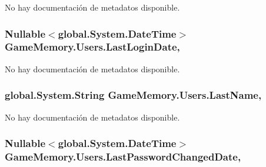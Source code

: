 No hay documentación de metadatos disponible. 

\hypertarget{class_game_memory_1_1_users_abb9ebf3a6108d29f1eea6eec2142b3d1}{
\subsubsection[{Last\-Login\-Date}]{\setlength{\rightskip}{0pt plus 5cm}Nullable$<$global.\-System.\-Date\-Time$>$ Game\-Memory.\-Users.\-Last\-Login\-Date\hspace{0.3cm}{\ttfamily [get]}, {\ttfamily [set]}}}\label{class_game_memory_1_1_users_abb9ebf3a6108d29f1eea6eec2142b3d1}


No hay documentación de metadatos disponible. 

\hypertarget{class_game_memory_1_1_users_a440ecd49516fc34c62e82845bcefbb69}{
\subsubsection[{Last\-Name}]{\setlength{\rightskip}{0pt plus 5cm}global.\-System.\-String Game\-Memory.\-Users.\-Last\-Name\hspace{0.3cm}{\ttfamily [get]}, {\ttfamily [set]}}}\label{class_game_memory_1_1_users_a440ecd49516fc34c62e82845bcefbb69}


No hay documentación de metadatos disponible. 

\hypertarget{class_game_memory_1_1_users_a98f39140ef43f86f9edcff50e40c982a}{
\subsubsection[{Last\-Password\-Changed\-Date}]{\setlength{\rightskip}{0pt plus 5cm}Nullable$<$global.\-System.\-Date\-Time$>$ Game\-Memory.\-Users.\-Last\-Password\-Changed\-Date\hspace{0.3cm}{\ttfamily [get]}, {\ttfamily [set]}}}\label{class_game_memory_1_1_users_a98f39140ef43f86f9edcff50e40c982a}


